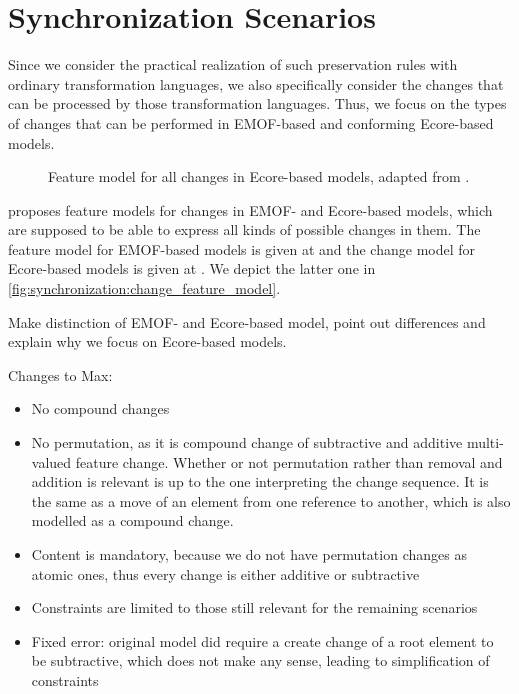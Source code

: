 \section{Synchronization Scenarios}

Since we consider the practical realization of such preservation rules with ordinary transformation languages, we also specifically consider the changes that can be processed by those transformation languages.
Thus, we focus on the types of changes that can be performed in EMOF-based and conforming Ecore-based models.

\begin{figure}
    \centering
    
    \caption{Feature model for all changes in Ecore-based models, adapted from \cite[Fig. 5.3]{kramer2017a}.}
    \label{fig:synchronization:change_feature_model}
\end{figure}

\textcite{kramer2017a} proposes feature models for changes in EMOF- and Ecore-based models, which are supposed to be able to express all kinds of possible changes in them.
The feature model for EMOF-based models is given at \cite[Fig. 5.2]{kramer2017a} and the change model for Ecore-based models is given at \cite[Fig. 5.3]{kramer2017a}.
We depict the latter one in \autoref{fig:synchronization:change_feature_model}.

Make distinction of EMOF- and Ecore-based model, point out differences and explain why we focus on Ecore-based models.


Changes to Max:
\begin{itemize}
    \item No compound changes
    \item No permutation, as it is compound change of subtractive and additive multi-valued feature change. Whether or not permutation rather than removal and addition is relevant is up to the one interpreting the change sequence. It is the same as a move of an element from one reference to another, which is also modelled as a compound change.
    \item Content is mandatory, because we do not have permutation changes as atomic ones, thus every change is either additive or subtractive
    \item Constraints are limited to those still relevant for the remaining scenarios
    \item Fixed error: original model did require a create change of a root element to be subtractive, which does not make any sense, leading to simplification of constraints
\end{itemize}

